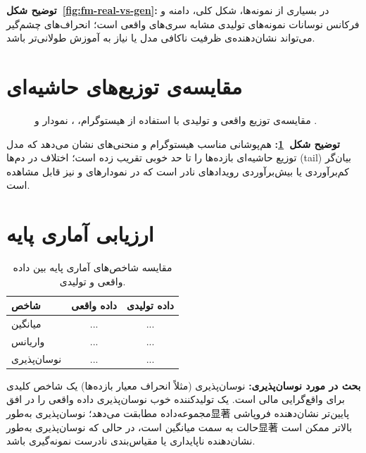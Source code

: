\noindent\textbf{توضیح شکل~\ref{fig:fm-real-vs-gen}:}
در بسیاری از نمونه‌ها، شکل کلی، دامنه و فرکانس نوسانات نمونه‌های تولیدی مشابه سری‌های واقعی است؛ انحراف‌های چشم‌گیر می‌تواند نشان‌دهنده‌ی ظرفیت ناکافی مدل یا نیاز به آموزش طولانی‌تر باشد.

\section{مقایسه‌ی توزیع‌های حاشیه‌ای}

\begin{figure}[H]
	\centering
	\caption{مقایسه‌ی توزیع  واقعی و تولیدی با استفاده از هیستوگرام، ، نمودار  و .}
	\label{fig:fm-dist}
\end{figure}

\noindent\textbf{توضیح شکل~\ref{fig:fm-dist}:}
هم‌پوشانی مناسب هیستوگرام و منحنی‌های  نشان می‌دهد که مدل توزیع حاشیه‌ای بازده‌ها را تا حد خوبی تقریب زده است؛ اختلاف در دم‌ها (tail) بیان‌گر کم‌برآوردی یا بیش‌برآوردی رویدادهای نادر است که در نمودارهای  و  نیز قابل مشاهده است.

\section{ارزیابی آماری پایه}

\begin{table}[H]
    \centering
    \begin{tabular}{lcc}
        \toprule
        \textbf{شاخص} & \textbf{داده واقعی} & \textbf{داده تولیدی} \\
        \midrule
        میانگین & ... & ... \\
        واریانس & ... & ... \\
        نوسان‌پذیری & ... & ... \\
        \bottomrule
    \end{tabular}
    \caption{مقایسه شاخص‌های آماری پایه بین داده واقعی و تولیدی.}
\end{table}

\noindent\textbf{بحث در مورد نوسان‌پذیری:}
نوسان‌پذیری (مثلاً انحراف معیار بازده‌ها) یک شاخص کلیدی برای واقع‌گرایی مالی است. یک تولیدکننده خوب نوسان‌پذیری داده واقعی را در افق مجموعه‌داده مطابقت می‌دهد؛ نوسان‌پذیری به‌طور显著 پایین‌تر نشان‌دهنده فروپاشی حالت به سمت میانگین است، در حالی که نوسان‌پذیری به‌طور显著 بالاتر ممکن است نشان‌دهنده ناپایداری یا مقیاس‌بندی نادرست نمونه‌گیری باشد.

